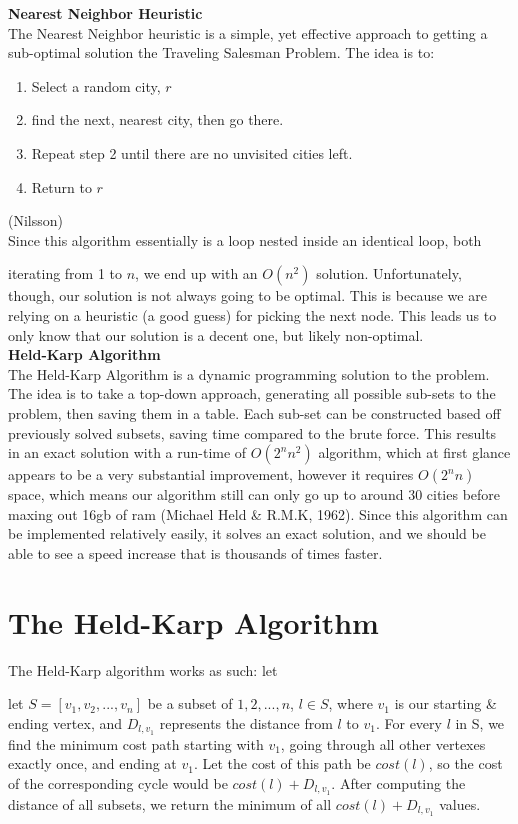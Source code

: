 \documentclass[a4paper,titlepage, margin, 11pt]{article}
\numberwithin{equation}{section}
\begin{document}
\textbf{Nearest Neighbor Heuristic}\\
The Nearest Neighbor heuristic is a simple, yet effective approach to getting a sub-optimal solution the Traveling Salesman Problem. The idea is to:

\begin{enumerate}
    \item Select a random city, $r$
    \item find the next, nearest city, then go there.
    \item Repeat step 2 until there are no unvisited cities left.
    \item Return to $r$
\end{enumerate}
(Nilsson)\\
Since this algorithm essentially is a loop nested inside an identical loop, both

iterating from 1 to $n$, we end up with an $O(n^2)$ solution. Unfortunately, though, our solution is not always going to be optimal. This is because we are relying on a heuristic (a good guess) for picking the next node. This leads us to only know that our solution is a decent one, but likely non-optimal. \\


\textbf{Held-Karp Algorithm}\\
The Held-Karp Algorithm is a dynamic programming solution to the problem. The idea is to take a top-down approach, generating all possible sub-sets to the problem, then saving them in a table. Each sub-set can be constructed based off previously solved subsets, saving time compared to the brute force. This results in an exact solution with a run-time of $O(2^nn^2)$ algorithm, which at first glance appears to be a very substantial improvement, however it requires $O(2^nn)$ space, which means our algorithm still can only go up to around 30 cities before maxing out 16gb of ram (Michael Held \& R.M.K, 1962). Since this algorithm can be implemented relatively easily, it solves an exact solution, and we should be able to see a speed increase that is thousands of times faster.

\section{The Held-Karp Algorithm}
The Held-Karp algorithm works as such:
let 

let $S = [v_1, v_2, ..., v_{n}]$ be a subset  of ${1,2,..., n}$, $l \in S$, where $v_1$ is our starting \& ending vertex, and $D_{l,v_1}$ represents the distance from $l$ to $v_1$. 
For every $l$ in S, we find the minimum cost path starting with $v_1$, going through all other vertexes exactly once, and ending at $v_1$. Let the cost of this path be $cost(l)$, so the cost of the corresponding cycle would be $cost(l) + D_{l,v_1}$. After computing the distance of all subsets, we return the minimum of all $cost(l) + D_{l,v_1}$ values.
\end{document}
